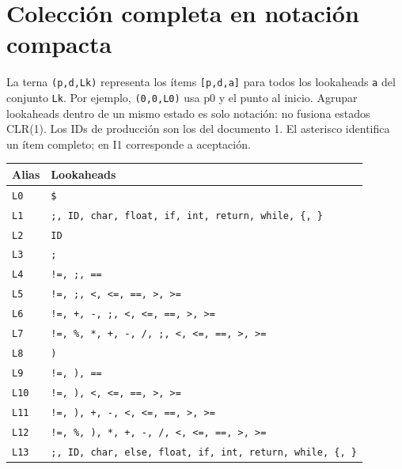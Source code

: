 \section*{Colección completa en notación compacta}
La terna \texttt{(p,d,Lk)} representa los ítems \texttt{[p,d,a]} para todos los lookaheads \texttt{a} del conjunto \texttt{Lk}. Por ejemplo, \texttt{(0,0,L0)} usa p0 y el punto al inicio. Agrupar lookaheads dentro de un mismo estado es solo notación: no fusiona estados CLR(1). Los IDs de producción son los del documento 1. El asterisco identifica un ítem completo; en I1 corresponde a aceptación.
{\small\begin{longtable}{@{}p{1.3cm}p{14.2cm}@{}}\toprule Alias & Lookaheads\\\midrule\endhead
\texttt{L0} & \texttt{\$}\\
\texttt{L1} & \texttt{;, ID, char, float, if, int, return, while, \{, \}}\\
\texttt{L2} & \texttt{ID}\\
\texttt{L3} & \texttt{;}\\
\texttt{L4} & \texttt{!=, ;, ==}\\
\texttt{L5} & \texttt{!=, ;, \textless{}, \textless{}=, ==, \textgreater{}, \textgreater{}=}\\
\texttt{L6} & \texttt{!=, +, -, ;, \textless{}, \textless{}=, ==, \textgreater{}, \textgreater{}=}\\
\texttt{L7} & \texttt{!=, \%, *, +, -, /, ;, \textless{}, \textless{}=, ==, \textgreater{}, \textgreater{}=}\\
\texttt{L8} & \texttt{)}\\
\texttt{L9} & \texttt{!=, ), ==}\\
\texttt{L10} & \texttt{!=, ), \textless{}, \textless{}=, ==, \textgreater{}, \textgreater{}=}\\
\texttt{L11} & \texttt{!=, ), +, -, \textless{}, \textless{}=, ==, \textgreater{}, \textgreater{}=}\\
\texttt{L12} & \texttt{!=, \%, ), *, +, -, /, \textless{}, \textless{}=, ==, \textgreater{}, \textgreater{}=}\\
\texttt{L13} & \texttt{;, ID, char, else, float, if, int, return, while, \{, \}}\\
\bottomrule\end{longtable}}
